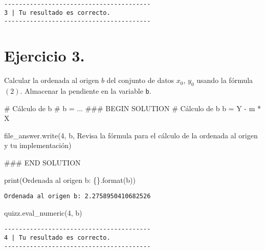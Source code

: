 \documentclass[
  letterpaper,
  DIV=11,
  numbers=noendperiod]{scrreprt}
\newenvironment{Shaded}{\begin{snugshade}}{\end{snugshade}}
\newcommand{\BuiltInTok}[1]{\textcolor[rgb]{0.00,0.23,0.31}{#1}}
\newcommand{\CommentTok}[1]{\textcolor[rgb]{0.37,0.37,0.37}{#1}}
\newcommand{\NormalTok}[1]{\textcolor[rgb]{0.00,0.23,0.31}{#1}}
\newcommand{\OperatorTok}[1]{\textcolor[rgb]{0.37,0.37,0.37}{#1}}
\newcommand{\RegionMarkerTok}[1]{\textcolor[rgb]{0.00,0.23,0.31}{#1}}
\newcommand{\SpecialCharTok}[1]{\textcolor[rgb]{0.37,0.37,0.37}{#1}}
\newcommand{\StringTok}[1]{\textcolor[rgb]{0.13,0.47,0.30}{#1}}
\begin{document}
\begin{verbatim}
----------------------------------------
3 | Tu resultado es correcto.
----------------------------------------
\end{verbatim}

\section{\texorpdfstring{\textbf{Ejercicio
3.}}{Ejercicio 3.}}\label{ejercicio-3.}

Calcular la ordenada al origen \(b\) del conjunto de datos \(x_0\),
\(y_0\) usando la fórmula \((2)\). Almacenar la pendiente en la variable
\texttt{b}.

\begin{Shaded}
\begin{Highlighting}[]
\CommentTok{\# Cálculo de b}
\CommentTok{\# b = ...}
\CommentTok{\#\#\# }\RegionMarkerTok{BEGIN}\CommentTok{ SOLUTION}
\CommentTok{\# Cálculo de b}
\NormalTok{b }\OperatorTok{=}\NormalTok{ Y }\OperatorTok{{-}}\NormalTok{ m }\OperatorTok{*}\NormalTok{ X}

\NormalTok{file\_answer.write(}\StringTok{\textquotesingle{}4\textquotesingle{}}\NormalTok{, b, }\StringTok{\textquotesingle{}Revisa la fórmula para el cálculo de la ordenada al origen y tu implementación\textquotesingle{}}\NormalTok{)}

\CommentTok{\#\#\# }\RegionMarkerTok{END}\CommentTok{ SOLUTION}

\BuiltInTok{print}\NormalTok{(}\StringTok{\textquotesingle{}Ordenada al origen b: }\SpecialCharTok{\{\}}\StringTok{\textquotesingle{}}\NormalTok{.}\BuiltInTok{format}\NormalTok{(b))}
\end{Highlighting}
\end{Shaded}

\begin{verbatim}
Ordenada al origen b: 2.2758950410682526
\end{verbatim}

\begin{Shaded}
\begin{Highlighting}[]
\NormalTok{quizz.eval\_numeric(}\StringTok{\textquotesingle{}4\textquotesingle{}}\NormalTok{, b)}
\end{Highlighting}
\end{Shaded}

\begin{verbatim}
----------------------------------------
4 | Tu resultado es correcto.
----------------------------------------
\end{verbatim}
\end{document}
